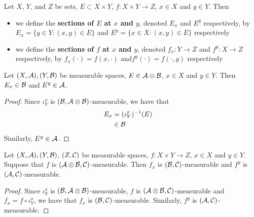 \documentclass{book}
\begin{document}
	\begin{defn}  
		Let $X$, $Y$, and $Z$ be sets, $E \subset X \times Y$, $f :X \times Y \rightarrow Z$, $x \in X$ and $y \in Y$. Then
		\begin{itemize}
			\item we define the \textbf{sections of $E$ at $x$ and $y$}, denoted $E_x$ and $E^y$ respectively, by $E_x = \{y \in Y: (x,y) \in E\}$ and $E^y = \{x \in X: (x,y) \in E\}$ respectively
			\item we define the \textbf{sections of $f$ at $x$ and $y$}, denoted $f_x:Y \rightarrow Z$ and $f^y:X \rightarrow Z$ respectively, by $f_x(\cdot) = f(x,\cdot)$ and$f^y(\cdot) = f(\cdot,y)$  respectively 
		\end{itemize}
	\end{defn}

	\begin{ex} 
		Let $(X,\mathcal{A}), (Y, \mathcal{B})$ be measurable spaces, $E \in \mathcal{A} \otimes \mathcal{B}$, $x \in X$ and $y \in Y$. Then $E_x \in \mathcal{B}$ and $E^y \in \mathcal{A}$.  
	\end{ex}
	
	\begin{proof}
		Since $\iota^x_Y$ is $(\mathcal{B}, \mathcal{A} \otimes \mathcal{B})$-measurable, we have that
		\begin{align*}
			E_x 
			& = (\iota^x_Y)^{-1}(E) \\
			& \in \mathcal{B} 
		\end{align*}
		Similarly, $E^y \in \mathcal{A}$. 
	\end{proof}
	
	\begin{ex}  
		Let $(X,\mathcal{A}), (Y, \mathcal{B})$, $(Z, \mathcal{C})$ be measurable spaces, $f: X \times Y \rightarrow Z$, $x \in X$ and $y \in Y$. Suppose that $f$ is $(\mathcal{A} \otimes \mathcal{B}, \mathcal{C})$-measurable. Then $f_x$ is $(\mathcal{B}, \mathcal{C})$-measurable and $f^y$ is $(\mathcal{A}, \mathcal{C})$-measurable. 
	\end{ex}
	
	\begin{proof}
		Since $\iota^x_Y$ is $(\mathcal{B}, \mathcal{A} \otimes \mathcal{B})$-measurable, $f$ is $(\mathcal{A} \otimes \mathcal{B}, \mathcal{C})$-measurable and $f_x = f \circ \iota^x_Y$, we have that $f_x$ is $(\mathcal{B}, \mathcal{C})$-measurable. Similarly, $f^y$ is $(\mathcal{A}, \mathcal{C})$-measurable.
	\end{proof}
\end{document}
